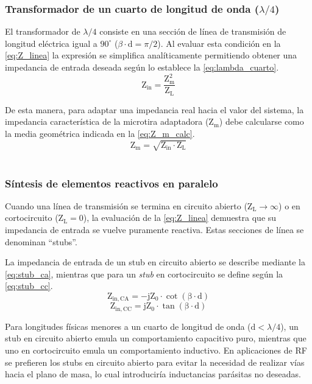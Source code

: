 \documentclass{article}
\begin{document}
\subsubsection{Transformador de un cuarto de longitud de onda ($\lambda/4$)} \label{section:sec_2.8.1}
El transformador de $\lambda/4$ consiste en una sección de línea de transmisión de longitud eléctrica igual a $90^\circ$ ($\beta \cdot \mathrm{d} = \pi/2$). Al evaluar esta condición en la \autoref{eq:Z_linea} la expresión se simplifica analíticamente permitiendo obtener una impedancia de entrada deseada según lo establece la \autoref{eq:lambda_cuarto}.
\begin{equation}
    \mathrm{Z_{in} = \frac{Z_{m}^{2}}{Z_{L}}}
    \label{eq:lambda_cuarto}
\end{equation}

De esta manera, para adaptar una impedancia real hacia el valor del sistema, la impedancia característica de la microtira adaptadora ($\mathrm{Z_m}$) debe calcularse como la media geométrica indicada en la \autoref{eq:Z_m_calc}.
\begin{equation}
    \mathrm{Z_m = \sqrt{Z_{in} \cdot Z_{L}}}
    \label{eq:Z_m_calc}
\end{equation}
\\



\subsubsection{Síntesis de elementos reactivos en paralelo} \label{section:sec_2.8.2}
Cuando una línea de transmisión se termina en circuito abierto ($\mathrm{Z_L \rightarrow \infty}$) o en cortocircuito ($\mathrm{Z_L = 0}$), la evaluación de la \autoref{eq:Z_linea} demuestra que su impedancia de entrada se vuelve puramente reactiva. Estas secciones de línea se denominan ``stubs''.

La impedancia de entrada de un stub en circuito abierto se describe mediante la \autoref{eq:stub_ca}, mientras que para un \textit{stub} en cortocircuito se define según la \autoref{eq:stub_cc}.
\begin{equation}
    \mathrm{Z_{in, CA} = -j Z_{0} \cdot \cot(\beta \cdot d)}
    \label{eq:stub_ca}
\end{equation}
\begin{equation}
    \mathrm{Z_{in, CC} = j Z_{0} \cdot \tan(\beta \cdot d)}
    \label{eq:stub_cc}
\end{equation}

Para longitudes físicas menores a un cuarto de longitud de onda ($\mathrm{d} < \lambda/4$), un stub en circuito abierto emula un comportamiento capacitivo puro, mientras que uno en cortocircuito emula un comportamiento inductivo. En aplicaciones de RF se prefieren los stubs en circuito abierto para evitar la necesidad de realizar vías hacia el plano de masa, lo cual introduciría inductancias parásitas no deseadas.
\\
\end{document}

